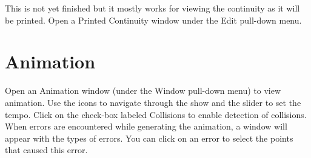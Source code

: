 This is not yet finished but it mostly works for viewing the continuity
as it will be printed.  Open a Printed Continuity window under the Edit
pull-down menu.

\section{Animation}\label{animwin}

Open an Animation window (under the Window pull-down menu) to view animation.
Use the icons to navigate through the show and the slider to set the tempo.
Click on the check-box labeled Collisions to enable detection of collisions.
When errors are encountered while generating
the animation, a window will appear with the types of errors.  You can
click on an error to select the points that caused this error.

